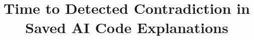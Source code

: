 \documentclass[10pt,conference]{IEEEtran}
\begin{document}
\title{Time to Detected Contradiction in Saved AI Code Explanations}

\author{}

\maketitle









\clearpage
\begingroup\scriptsize


\endgroup
\end{document}
